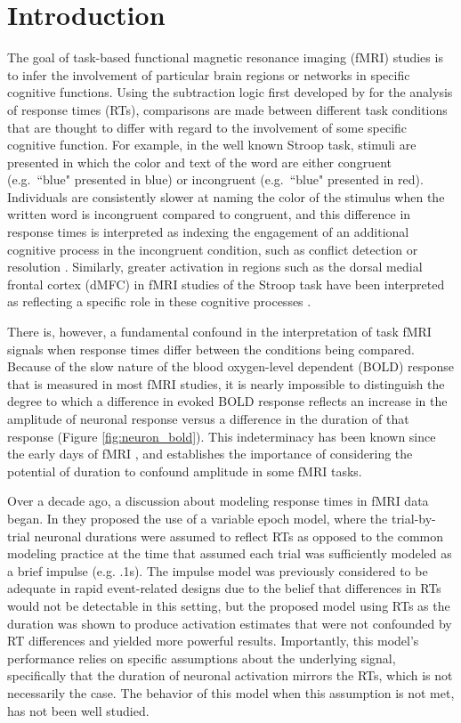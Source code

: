 \documentclass[titlepage,12pt] {article}
\begin{document}
\section*{Introduction}

The goal of task-based functional magnetic resonance imaging (fMRI) studies is to infer the involvement of particular brain regions or networks in specific cognitive functions.  Using the subtraction logic first developed by \citet{donders1969} for the analysis of response times (RTs), comparisons are made between different task conditions that are thought to differ with regard to the involvement of some specific cognitive function.  For example, in the well known Stroop task, stimuli are presented in which the color and text of the word are either congruent (e.g.\ ``blue" presented in blue) or incongruent (e.g.\ ``blue" presented in red).  Individuals are consistently slower at naming the color of the stimulus when the written word is incongruent compared to congruent, and this difference in response times is interpreted as indexing the engagement of an additional cognitive process in the incongruent condition, such as conflict detection or resolution \citep{botvinick2001}. Similarly, greater activation in regions such as the dorsal medial frontal cortex (dMFC) in fMRI studies of the Stroop task have been interpreted as reflecting a specific role in these cognitive processes \citep{botvinick1999, macdonald2000, kernsAnteriorCingulateConflict2004}.  

There is, however, a fundamental confound in the interpretation of task fMRI signals when response times differ between the conditions being compared. Because of the slow nature of the blood oxygen-level dependent (BOLD) response that is measured in most fMRI studies, it is nearly impossible to distinguish the degree to which a difference in evoked BOLD response reflects an increase in the amplitude of neuronal response versus a difference in the duration of that response (Figure \ref{fig:neuron_bold}).  This indeterminacy has been known since the early days of fMRI \citep{savoy1995, fslbook2001}, and establishes the importance of considering the potential of duration to confound amplitude in some fMRI tasks.  

Over a decade ago, a discussion about modeling response times in fMRI data began.  In \citet{grinband_detection_2008} they proposed the use of a variable epoch model, where the trial-by-trial neuronal durations were assumed to reflect RTs as opposed to the common modeling practice at the time that assumed each trial was sufficiently modeled as a brief impulse (e.g. .1s).  The impulse model was previously considered to be adequate in rapid event-related designs due to the belief that differences in RTs would not be detectable in this setting, but the proposed model using RTs as the duration was shown to produce activation estimates that were not confounded by RT differences and yielded more powerful results.  Importantly, this model's performance relies on specific assumptions about the underlying signal, specifically that the duration of neuronal activation mirrors the RTs, which is not necessarily the case.  The behavior of this model when this assumption is not met, has not been well studied.
\end{document}
